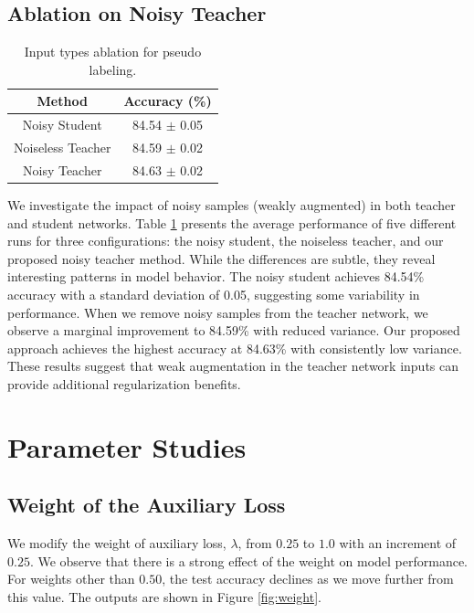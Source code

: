 \subsection{Ablation on Noisy Teacher}

\begin{table}[!htbp]
\centering
\begin{tabular}{cc}
\hline
\textbf{Method} & \textbf{Accuracy (\%)} \\
\hline
Noisy Student    & 84.54 $\pm$ 0.05 \\
Noiseless Teacher & 84.59 $\pm$ 0.02 \\
Noisy Teacher     & 84.63 $\pm$ 0.02 \\
\hline
\end{tabular}
\caption{Input types ablation for pseudo labeling.}
\label{table:noise}
\end{table}

We investigate the impact of noisy samples (weakly augmented) in both teacher and student networks. Table \ref{table:noise} presents the average performance of five different runs for three configurations: the noisy student, the noiseless teacher, and our proposed noisy teacher method. While the differences are subtle, they reveal interesting patterns in model behavior. The noisy student achieves 84.54\% accuracy with a standard deviation of 0.05, suggesting some variability in performance. When we remove noisy samples from the teacher network, we observe a marginal improvement to 84.59\% with reduced variance. Our proposed approach achieves the highest accuracy at 84.63\% with consistently low variance. These results suggest that weak augmentation in the teacher network inputs can provide additional regularization benefits.



\section{Parameter Studies}

\subsection{Weight of the Auxiliary Loss}

We modify the weight of auxiliary loss, $\lambda$, from $0.25$ to $1.0$ with an increment of $0.25$. We observe that there is a strong effect of the weight on model performance. For weights other than $0.50$, the test accuracy declines as we move further from this value. The outputs are shown in Figure \ref{fig:weight}.

